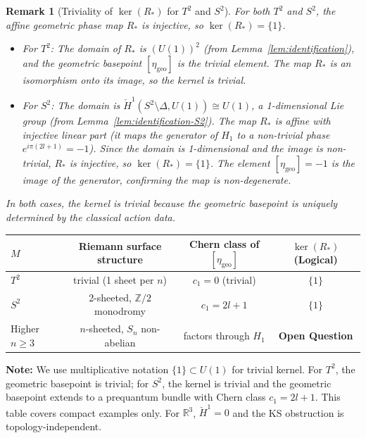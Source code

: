 \documentclass[11pt]{article}
\newtheorem{remark}[theorem]{Remark}
\begin{document}
\begin{remark}[Triviality of $\ker(R_*)$ for $T^2$ and $S^2$]
For both $T^2$ and $S^2$, the affine geometric phase map $R_*$ is injective, so $\ker(R_*) = \{1\}$.
\begin{itemize}
\item For $T^2$: The domain of $R_*$ is $(U(1))^2$ (from Lemma~\ref{lem:identification}), and the geometric basepoint $[\eta_{\mathrm{geo}}]$ is the trivial element. The map $R_*$ is an isomorphism onto its image, so the kernel is trivial.
\item For $S^2$: The domain is $\check{H}^1(S^2 \setminus \Delta, U(1)) \cong U(1)$, a 1-dimensional Lie group (from Lemma~\ref{lem:identification-S2}). The map $R_*$ is affine with injective linear part (it maps the generator of $H_1$ to a non-trivial phase $e^{i\pi(2l+1)} = -1$). Since the domain is 1-dimensional and the image is non-trivial, $R_*$ is injective, so $\ker(R_*) = \{1\}$. The element $[\eta_{\mathrm{geo}}] = -1$ is the image of the generator, confirming the map is non-degenerate.
\end{itemize}
In both cases, the kernel is trivial because the geometric basepoint is uniquely determined by the classical action data.
\end{remark}

\begin{center}
\renewcommand{\arraystretch}{1.3}
\begin{tabular}{lccc}
\toprule
$M$ & Riemann surface structure & Chern class of $[\eta_{\mathrm{geo}}]$ & $\ker(R_*)$ (Logical) \\
\midrule
$T^2$ & trivial (1 sheet per $n$) & $c_1 = 0$ (trivial) & $\{1\}$ \\
$S^2$ & 2-sheeted, $\mathbb{Z}/2$ monodromy & $c_1 = 2l+1$ & $\{1\}$ \\
Higher $n \geq 3$ & $n$-sheeted, $S_n$ non-abelian & factors through $H_1$ & \textbf{Open Question} \\
\bottomrule
\end{tabular}
\end{center}

\textbf{Note:} We use multiplicative notation $\{1\} \subset U(1)$ for trivial
kernel. For $T^2$, the geometric basepoint is trivial; for $S^2$, the kernel
is trivial and the geometric basepoint extends to a prequantum bundle with Chern class $c_1 = 2l+1$.
This table covers compact examples only. For $\mathbb{R}^3$,
$\check{H}^1 = 0$ and the KS obstruction is topology-independent.
\end{document}
